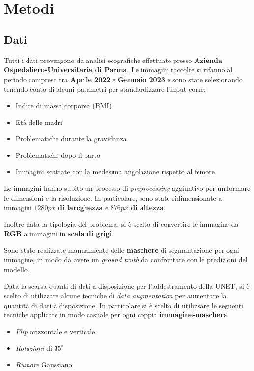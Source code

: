 

\section{Metodi}
\subsection{Dati}

Tutti i dati provengono da analisi ecografiche effettuate presso \textbf{Azienda Ospedaliero-Universitaria di Parma}.
Le immagini raccolte si rifanno al periodo compreso tra \textbf{Aprile 2022} e \textbf{Gennaio 2023} e sono state selezionando tenendo conto di alcuni parametri per standardizzare l'input come:
\begin{itemize}
  \item Indice di massa corporea (BMI)
  \item Età delle madri
  \item Problematiche durante la gravidanza
  \item Problematiche dopo il parto
  \item Immagini scattate con la medesima angolazione rispetto al femore
\end{itemize}


Le immagini hanno subito un processo di \textit{preprocessing} aggiuntivo per uniformare le dimensioni e la risoluzione. In particolare, sono state ridimensionate a immagini \textbf{$1280px$ di larcghezza} e \textbf{$876px$ di altezza}.


Inoltre data la tipologia del problema, si è scelto di convertire le immagine da \textbf{RGB} a immagini in \textbf{scala di grigi}.


Sono state realizzate manualmente delle \textbf{maschere} di segmantazione per ogni immagine, in modo da avere un \textit{ground truth} da confrontare con le predizioni del modello.


Data la scarsa quanti di dati a disposizione per l'addestramento della UNET, si è scelto di utilizzare alcune tecniche di \textit{data augmentation} per aumentare la quantità di dati a disposizione. In particolare si è scelto di utilizzare le seguenti tecniche applicate in modo casuale per ogni coppia \textbf{immagine-maschera}
\begin{itemize}
	\item \textit{Flip} orizzontale e verticale
	\item \textit{Rotazioni} di $35^{\circ}$
	\item \textit{Rumore} Gaussiano
\end{itemize}

